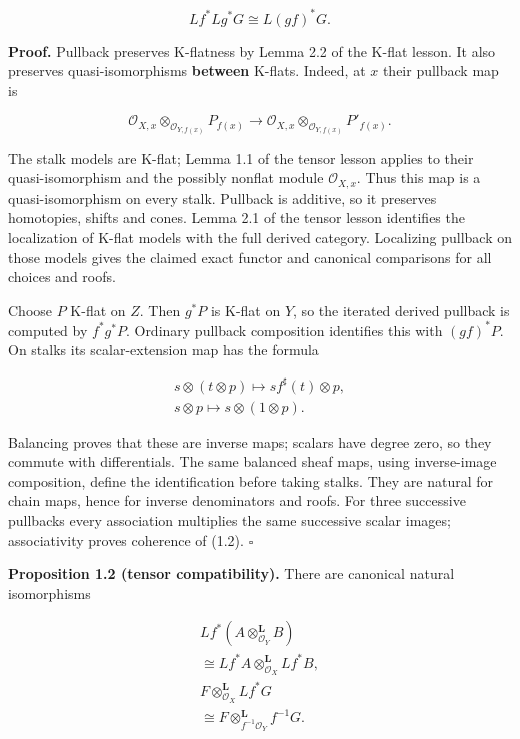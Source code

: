 \documentclass[
  english,
  11pt,
  a4paper,
]{article}
\begin{document}
\[Lf^*Lg^*G\cong L(gf)^*G.
\tag{1.2}\]

\textbf{Proof.} Pullback preserves K-flatness by Lemma 2.2 of the K-flat
lesson. It also preserves quasi-isomorphisms \textbf{between} K-flats.
Indeed, at \(x\) their pullback map is

\[\mathcal O_{X,x}\otimes_{\mathcal O_{Y,f(x)}}P_{f(x)}
\longrightarrow
\mathcal O_{X,x}\otimes_{\mathcal O_{Y,f(x)}}P'_{f(x)}.\]

The stalk models are K-flat; Lemma 1.1 of the tensor lesson applies to
their quasi-isomorphism and the possibly nonflat module
\(\mathcal O_{X,x}\). Thus this map is a quasi-isomorphism on every
stalk. Pullback is additive, so it preserves homotopies, shifts and
cones. Lemma 2.1 of the tensor lesson identifies the localization of
K-flat models with the full derived category. Localizing pullback on
those models gives the claimed exact functor and canonical comparisons
for all choices and roofs.

Choose \(P\) K-flat on \(Z\). Then \(g^*P\) is K-flat on \(Y\), so the
iterated derived pullback is computed by \(f^*g^*P\). Ordinary pullback
composition identifies this with \((gf)^*P\). On stalks its
scalar-extension map has the formula

\[\begin{gathered}
s\otimes(t\otimes p)\longmapsto s f^\sharp(t)\otimes p,\\
s\otimes p\longmapsto s\otimes(1\otimes p).
\end{gathered}\]

Balancing proves that these are inverse maps; scalars have degree zero,
so they commute with differentials. The same balanced sheaf maps, using
inverse-image composition, define the identification before taking
stalks. They are natural for chain maps, hence for inverse denominators
and roofs. For three successive pullbacks every association multiplies
the same successive scalar images; associativity proves coherence of
(1.2). \(\square\)

\textbf{Proposition 1.2 (tensor compatibility).} There are canonical
natural isomorphisms

\[\begin{gathered}
Lf^*(A\otimes_{\mathcal O_Y}^{\mathbf L}B)
\\ \cong Lf^*A\otimes_{\mathcal O_X}^{\mathbf L}Lf^*B,\\
F\otimes_{\mathcal O_X}^{\mathbf L}Lf^*G
\\ \cong F\otimes_{f^{-1}\mathcal O_Y}^{\mathbf L}f^{-1}G.
\end{gathered}
\tag{1.3}\]
\end{document}

